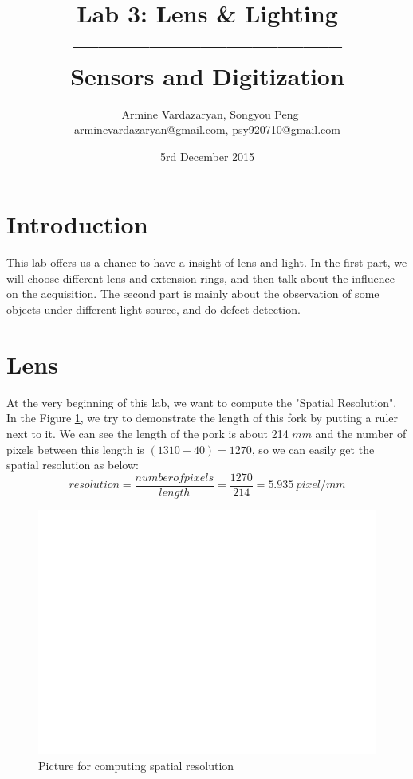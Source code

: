 \documentclass[english]{article}
\begin{document}
\title{Lab 3: Lens \& Lighting\\ -------------------------------- \\ \Large Sensors and Digitization}
\author{ \ Armine Vardazaryan, Songyou Peng \\ arminevardazaryan@gmail.com, psy920710@gmail.com}
\date{5rd December 2015}

\maketitle

\section{Introduction}
This lab offers us a chance to have a insight of lens and light.
In the first part, we will choose different lens and extension rings, and then talk about the influence on the acquisition.
The second part is mainly about the observation of some objects under different light source, and do defect detection. 

\section{Lens}
At the very beginning of this lab, we want to compute the "Spatial Resolution". In the Figure \ref{fig:one}, we try to demonstrate the length of this fork by putting a ruler next to it.
We can see the length of the pork is about 214 $mm$ and the number of pixels between this length is $(1310 - 40) = 1270$, so we can easily get the spatial resolution as below:
$$
resolution = \frac{number of pixels}{length} = \frac{1270}{214} = 5.935\ pixel/mm
$$
\begin{figure}[H]
	\centering
	\includegraphics[width=1\linewidth]{Pictures/spatial_resolution.png}
	\caption{Picture for computing spatial resolution}
	\label{fig:one}
\end{figure} 
\end{document}
